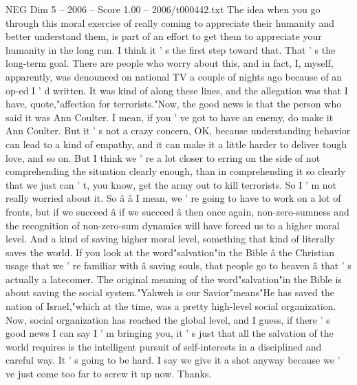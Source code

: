 \begin{textsample}{NEG Dim 5 – 2006 – Score 1.00 – 2006/t000442.txt}
The idea when you go through this moral exercise of really coming to appreciate their humanity and better understand them, is part of an effort to get them to appreciate your humanity in the long run.
I think it ' s the first step toward that.
That ' s the long-term goal.
There are people who worry about this, and in fact, I, myself, apparently, was denounced on national TV a couple of nights ago because of an op-ed I ' d written.
It was kind of along these lines, and the allegation was that I have, quote,"affection for terrorists."Now, the good news is that the person who said it was Ann Coulter.
I mean, if you ' ve got to have an enemy, do make it Ann Coulter.
But it ' s not a crazy concern, OK, because understanding behavior can lead to a kind of empathy, and it can make it a little harder to deliver tough love, and so on.
But I think we ' re a lot closer to erring on the side of not comprehending the situation clearly enough, than in comprehending it so clearly that we just can ' t, you know, get the army out to kill terrorists.
So I ' m not really worried about it.
So â â I mean, we ' re going to have to work on a lot of fronts, but if we succeed â if we succeed â then once again, non-zero-sumness and the recognition of non-zero-sum dynamics will have forced us to a higher moral level.
And a kind of saving higher moral level, something that kind of literally saves the world.
If you look at the word"salvation"in the Bible â the Christian usage that we ' re familiar with â saving souls, that people go to heaven â that ' s actually a latecomer.
The original meaning of the word"salvation"in the Bible is about saving the social system."Yahweh is our Savior"means"He has saved the nation of Israel,"which at the time, was a pretty high-level social organization.
Now, social organization has reached the global level, and I guess, if there ' s good news I can say I ' m bringing you, it ' s just that all the salvation of the world requires is the intelligent pursuit of self-interests in a disciplined and careful way.
It ' s going to be hard.
I say we give it a shot anyway because we ' ve just come too far to screw it up now.
Thanks.

\end{textsample}

